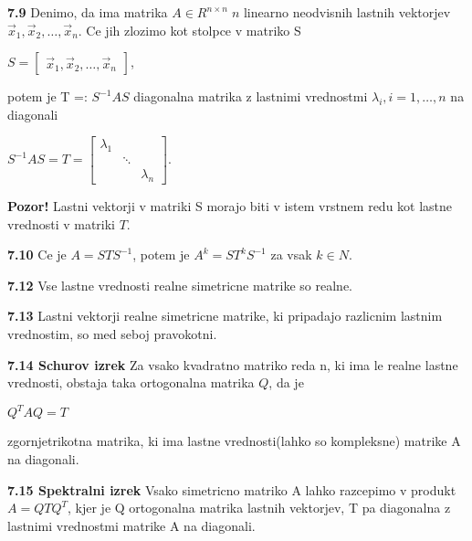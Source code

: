 \documentclass{article}
\begin{document}
\begin{multicols}{4}
	\textbf{7.9} Denimo, da ima matrika $A \in R^{n \times n}\; n$ linearno neodvisnih lastnih vektorjev
	$\vec{x}_{1}, \vec{x}_{2}, \dots, \vec{x}_{n}$. Ce jih zlozimo kot stolpce v matriko S
	\begin{center}
		\begin{math}
			S =
			\begin{bmatrix}
				\vec{x}_{1}, \vec{x}_{2}, \dots, \vec{x}_{n}
			\end{bmatrix}
		\end{math},
	\end{center}
	potem je T =: $S^{-1}AS$ diagonalna matrika z lastnimi vrednostmi $\lambda_{i}, i = 1, \dots, n$ na diagonali
	\begin{center}
		\begin{math}
			S^{-1}AS = T =
			\begin{bmatrix}
				\lambda_{1} &        &             \\
				            & \ddots &             \\
				            &        & \lambda_{n}
			\end{bmatrix}
		\end{math}.
	\end{center}

	\textbf{Pozor!} Lastni vektorji v matriki S morajo biti v istem vrstnem redu kot lastne vrednosti v matriki $T$.

	\textbf{7.10} Ce je $A = STS^{-1}$, potem je $A^{k} = ST^{k}S^{-1}$ za vsak $k \in N$.

	\textbf{7.12} Vse lastne vrednosti realne simetricne matrike so realne.

	\textbf{7.13} Lastni vektorji realne simetricne matrike, ki pripadajo razlicnim lastnim
	vrednostim, so med seboj pravokotni.

	\textbf{7.14 Schurov izrek} Za vsako kvadratno matriko reda n, ki ima le realne lastne vrednosti,
	obstaja taka ortogonalna matrika $Q$, da je
	\begin{center}
		\begin{math}
			Q^{T}AQ = T
		\end{math}
	\end{center}
	zgornjetrikotna matrika, ki ima lastne vrednosti(lahko so kompleksne) matrike A na diagonali.

	\textbf{7.15 Spektralni izrek} Vsako simetricno matriko A lahko razcepimo v produkt
	$A = QTQ^{T}$, kjer je Q ortogonalna matrika lastnih vektorjev, T pa diagonalna z lastnimi
	vrednostmi matrike A na diagonali.


\end{multicols}
\end{document}
